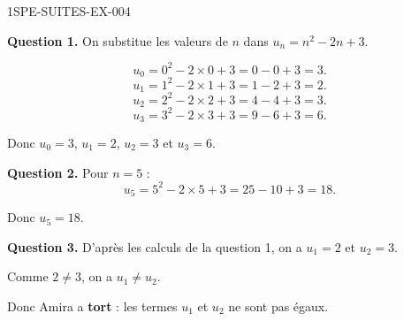 \begin{corrige}{1SPE-SUITES-EX-004}


\textbf{Question 1.} On substitue les valeurs de $n$ dans $u_n = n^2 - 2n + 3$.

\[
u_0 = 0^2 - 2 \times 0 + 3 = 0 - 0 + 3 = 3.
\]
\[
u_1 = 1^2 - 2 \times 1 + 3 = 1 - 2 + 3 = 2.
\]
\[
u_2 = 2^2 - 2 \times 2 + 3 = 4 - 4 + 3 = 3.
\]
\[
u_3 = 3^2 - 2 \times 3 + 3 = 9 - 6 + 3 = 6.
\]

Donc $u_0 = 3$, $u_1 = 2$, $u_2 = 3$ et $u_3 = 6$.

\textbf{Question 2.} Pour $n = 5$ :
\[
u_5 = 5^2 - 2 \times 5 + 3 = 25 - 10 + 3 = 18.
\]

Donc $u_5 = 18$.


\textbf{Question 3.} D'après les calculs de la question 1, on a $u_1 = 2$ et $u_2 = 3$.

Comme $2 \neq 3$, on a $u_1 \neq u_2$.

Donc Amira a \textbf{tort} : les termes $u_1$ et $u_2$ ne sont pas égaux.

\end{corrige}
